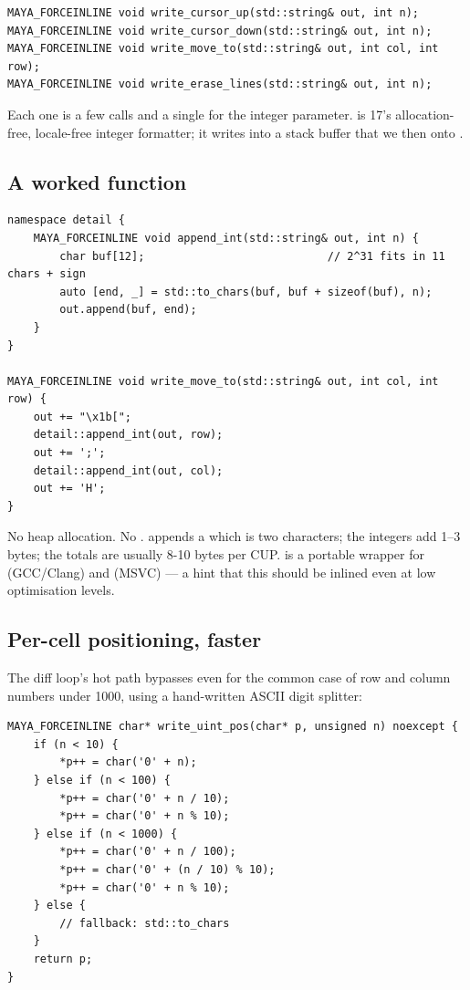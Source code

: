 \begin{lstlisting}
MAYA_FORCEINLINE void write_cursor_up(std::string& out, int n);
MAYA_FORCEINLINE void write_cursor_down(std::string& out, int n);
MAYA_FORCEINLINE void write_move_to(std::string& out, int col, int row);
MAYA_FORCEINLINE void write_erase_lines(std::string& out, int n);
\end{lstlisting}

Each one is a few  calls and a single
 for the integer parameter. 
is \cpp{}17's allocation-free, locale-free integer formatter; it
writes into a stack buffer that we then  onto .

\subsection{A worked function}

\begin{lstlisting}
namespace detail {
    MAYA_FORCEINLINE void append_int(std::string& out, int n) {
        char buf[12];                            // 2^31 fits in 11 chars + sign
        auto [end, _] = std::to_chars(buf, buf + sizeof(buf), n);
        out.append(buf, end);
    }
}

MAYA_FORCEINLINE void write_move_to(std::string& out, int col, int row) {
    out += "\x1b[";
    detail::append_int(out, row);
    out += ';';
    detail::append_int(out, col);
    out += 'H';
}
\end{lstlisting}

No heap allocation. No . \code{out += "\textbackslash
x1b["} appends a  which is two characters; the
integers add 1--3 bytes; the totals are usually 8-10 bytes per CUP.
 is a portable wrapper for
 (GCC/Clang) and
 (MSVC) --- a hint that this should be inlined
even at low optimisation levels.

\subsection{Per-cell positioning, faster}

The diff loop's hot path bypasses even  for the
common case of row and column numbers under 1000, using a hand-written
ASCII digit splitter:

\begin{lstlisting}
MAYA_FORCEINLINE char* write_uint_pos(char* p, unsigned n) noexcept {
    if (n < 10) {
        *p++ = char('0' + n);
    } else if (n < 100) {
        *p++ = char('0' + n / 10);
        *p++ = char('0' + n % 10);
    } else if (n < 1000) {
        *p++ = char('0' + n / 100);
        *p++ = char('0' + (n / 10) % 10);
        *p++ = char('0' + n % 10);
    } else {
        // fallback: std::to_chars
    }
    return p;
}
\end{lstlisting}


